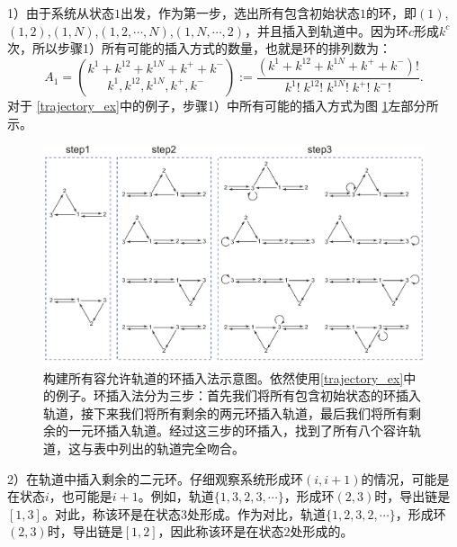 1）由于系统从状态$1$出发，作为第一步，选出所有包含初始状态$1$的环，即$(1)$,$(1,2)$,$(1,N)$,$(1,2,\cdots,N)$,$(1,N,\cdots,2)$，并且插入到轨道中。因为环$c$形成$k^c$次，所以步骤1）所有可能的插入方式的数量，也就是环的排列数为：
\begin{equation*}\label{formula:A1}
    A_1 = \binom{k^1+k^{12}+k^{1N}+k^{+}+k^{-}}{k^1,k^{12},k^{1N},k^{+},k^{-}}
    := \frac{(k^1+k^{12}+k^{1N}+k^{+}+k^{-})!}{k^1!\;k^{12}!\;k^{1N}!\;k^{+}!\;k^{-}!}.
\end{equation*}
对于 \ref{trajectory_ex}中的例子，步骤1）中所有可能的插入方式为图 \ref{figure:insertion}左部分所示。
\begin{figure}[htb!]
\centering
\includegraphics[scale=0.6]{chart/insertiongraph.pdf}
\caption{构建所有容允许轨道的环插入法示意图。依然使用\ref{trajectory_ex}中的例子。环插入法分为三步：首先我们将所有包含初始状态的环插入轨道，接下来我们将所有剩余的两元环插入轨道，最后我们将所有剩余的一元环插入轨道。经过这三步的环插入，找到了所有八个容许轨道，这与表中列出的轨道完全吻合。}
\label{figure:insertion}
\end{figure}

2）在轨道中插入剩余的二元环。仔细观察系统形成环$(i,i+1)$的情况，可能是在状态$i$，也可能是$i+1$。例如，轨道$\{1, 3, 2, 3, \cdots\}$，形成环$(2,3)$时，导出链是$[1, 3]$。对此，称该环是在状态$3$处形成。作为对比，轨道$\{1,2,3,2, \cdots\}$，形成环$(2,3)$时，导出链是$[1, 2]$，因此称该环是在状态$2$处形成的。

